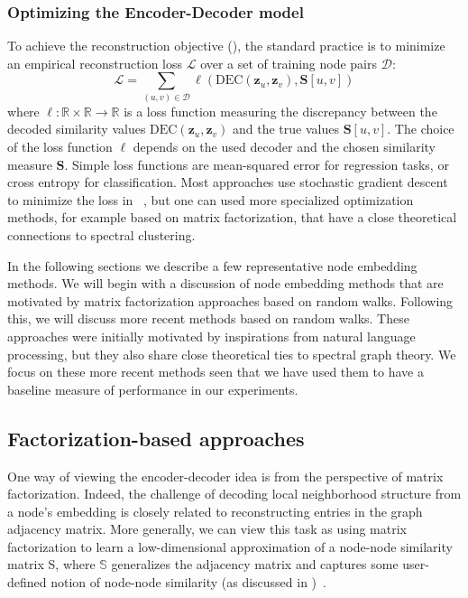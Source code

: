 \subsubsection{Optimizing the Encoder-Decoder model}
To achieve the reconstruction objective (), the standard practice is to minimize an empirical reconstruction loss $\mathcal{L}$ over a set of training node pairs $\mathcal{D}$:
\begin{equation}\label{eq:loss}
    \mathcal{L} = \sum_{(u,v)\in\mathcal{D}} \ell(\text{DEC}(\mathbf{z}_u, \mathbf{z}_v), \textbf{S}[u,v])
\end{equation}
where $\ell: \mathbb{R}\times\mathbb{R}\to\mathbb{R}$ is a loss function measuring the discrepancy between the decoded similarity values $\text{DEC}(\mathbf{z}_u, \mathbf{z}_v)$ and the true values $\textbf{S}[u,v]$. The choice of the loss function $\ell$ depends on the used decoder and the chosen similarity measure $\textbf{S}$. Simple loss functions are mean-squared error for regression tasks, or cross entropy for classification. Most approaches use stochastic gradient descent to minimize the loss in ~\cite{Robbins1951stochasticApproximation}, but one can used more specialized optimization methods, for example based on matrix factorization, that have a close theoretical connections to spectral clustering. 

In the following sections we describe a few representative node embedding methods. We will begin with a discussion of node embedding methods that are motivated by matrix factorization approaches based on random walks. Following this, we will discuss more recent methods based on random walks. These approaches were initially motivated by inspirations from natural language processing, but they also share close theoretical ties to spectral graph theory. We focus on these more recent methods seen that we have used them to have a baseline measure of performance in our experiments. 

\subsection{Factorization-based approaches}\label{sec:factorization}
One way of viewing the encoder-decoder idea is from the perspective of matrix factorization. Indeed, the challenge of decoding local neighborhood structure from a node's embedding is closely related to reconstructing entries in the graph adjacency matrix. More generally, we can view this task as using matrix factorization to learn a low-dimensional approximation of a node-node similarity matrix S, where $\mathbb{S}$ generalizes the adjacency matrix and captures some user-defined notion of node-node similarity (as discussed in )~\cite{Belkin2001laplacianEigenmapsSpectralClusteringTechniquesEmbeddingClustering}\cite{Kruskal1964MultidimensionalScalingOptimizingGoodnessFitNonmetricHypothesis}.

